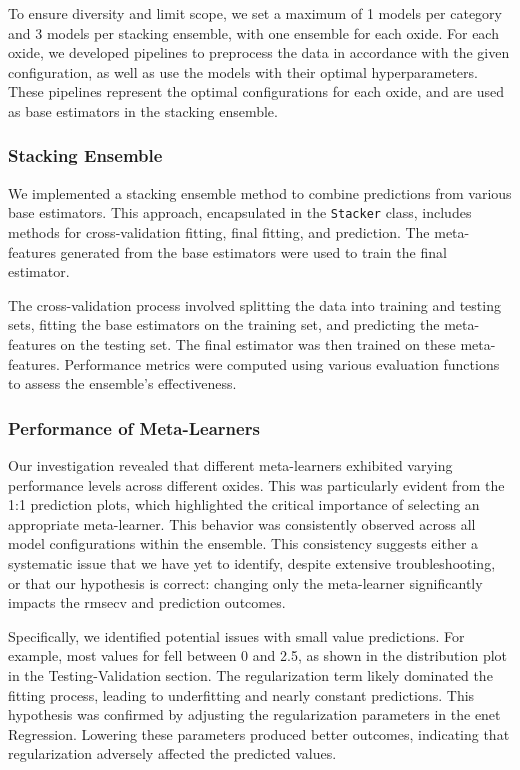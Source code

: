 To ensure diversity and limit scope, we set a maximum of 1 models per category and 3 models per stacking ensemble, with one ensemble for each oxide.
For each oxide, we developed pipelines to preprocess the data in accordance with the given configuration, as well as use the models with their optimal hyperparameters.
These pipelines represent the optimal configurations for each oxide, and are used as base estimators in the stacking ensemble.

\subsubsection{Stacking Ensemble}

We implemented a stacking ensemble method to combine predictions from various base estimators.
This approach, encapsulated in the \texttt{Stacker} class, includes methods for cross-validation fitting, final fitting, and prediction.
The meta-features generated from the base estimators were used to train the final estimator.

The cross-validation process involved splitting the data into training and testing sets, fitting the base estimators on the training set, and predicting the meta-features on the testing set.
The final estimator was then trained on these meta-features.
Performance metrics were computed using various evaluation functions to assess the ensemble's effectiveness.

\subsubsection{Performance of Meta-Learners}

Our investigation revealed that different meta-learners exhibited varying performance levels across different oxides.
This was particularly evident from the 1:1 prediction plots, which highlighted the critical importance of selecting an appropriate meta-learner.
This behavior was consistently observed across all model configurations within the ensemble.
This consistency suggests either a systematic issue that we have yet to identify, despite extensive troubleshooting, or that our hypothesis is correct: changing only the meta-learner significantly impacts the \gls{rmsecv} and prediction outcomes.

Specifically, we identified potential issues with small value predictions.
For example, most values for  fell between 0 and 2.5, as shown in the distribution plot in the Testing-Validation section.
The regularization term likely dominated the fitting process, leading to underfitting and nearly constant predictions.
This hypothesis was confirmed by adjusting the regularization parameters in the \gls{enet} Regression.
Lowering these parameters produced better outcomes, indicating that regularization adversely affected the predicted values.


